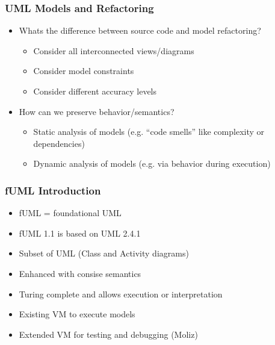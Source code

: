 \documentclass{beamer}
\begin{document}
\begin{frame}
\frametitle{UML Models and Refactoring}
\begin{itemize}
 \item Whats the difference between source code and model refactoring?
 \begin{itemize}
  \item Consider all interconnected views/diagrams
  \item Consider model constraints
  \item Consider different accuracy levels
 \end{itemize}
 \item How can we preserve behavior/semantics?
 \begin{itemize}
  \item Static analysis of models (e.g. ``code smells'' like complexity or dependencies)
  \item Dynamic analysis of models (e.g. via behavior during execution)
 \end{itemize}
\end{itemize}        
\end{frame}
        
\begin{frame}
\frametitle{fUML Introduction}
\begin{itemize}
 \item fUML = foundational UML
 \item fUML 1.1 is based on UML 2.4.1
 \item Subset of UML (Class and Activity diagrams)
 \item Enhanced with consise semantics
 \item Turing complete and allows execution or interpretation
 \item Existing VM to execute models
 \item Extended VM for testing and debugging (Moliz) \cite{DBLP:conf/models/MayerhoferLK12}
\end{itemize}

\end{frame}
        
\end{document}
